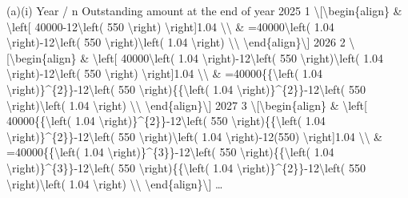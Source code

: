 \item (a)(i) Year / n Outstanding amount at the end of year 2025 1 \textbackslash{[}\textbackslash begin\{align\}
\& \textbackslash left{[} 40000-12\textbackslash left( 550 \textbackslash right)
\textbackslash right{]}1.04 \textbackslash\textbackslash{} \& =40000\textbackslash left(
1.04 \textbackslash right)-12\textbackslash left( 550 \textbackslash right)\textbackslash left(
1.04 \textbackslash right) \textbackslash\textbackslash{} \textbackslash end\{align\}\textbackslash{]}
2026 2 \textbackslash{[}\textbackslash begin\{align\} \& \textbackslash left{[}
40000\textbackslash left( 1.04 \textbackslash right)-12\textbackslash left(
550 \textbackslash right)\textbackslash left( 1.04 \textbackslash right)-12\textbackslash left(
550 \textbackslash right) \textbackslash right{]}1.04 \textbackslash\textbackslash{}
\& =40000\{\{\textbackslash left( 1.04 \textbackslash right)\}\textasciicircum\{2\}\}-12\textbackslash left(
550 \textbackslash right)\{\{\textbackslash left( 1.04 \textbackslash right)\}\textasciicircum\{2\}\}-12\textbackslash left(
550 \textbackslash right)\textbackslash left( 1.04 \textbackslash right)
\textbackslash\textbackslash{} \textbackslash end\{align\}\textbackslash{]}
2027 3 \textbackslash{[}\textbackslash begin\{align\} \& \textbackslash left{[}
40000\{\{\textbackslash left( 1.04 \textbackslash right)\}\textasciicircum\{2\}\}-12\textbackslash left(
550 \textbackslash right)\{\{\textbackslash left( 1.04 \textbackslash right)\}\textasciicircum\{2\}\}-12\textbackslash left(
550 \textbackslash right)\textbackslash left( 1.04 \textbackslash right)-12(550)
\textbackslash right{]}1.04 \textbackslash\textbackslash{} \& =40000\{\{\textbackslash left(
1.04 \textbackslash right)\}\textasciicircum\{3\}\}-12\textbackslash left(
550 \textbackslash right)\{\{\textbackslash left( 1.04 \textbackslash right)\}\textasciicircum\{3\}\}-12\textbackslash left(
550 \textbackslash right)\{\{\textbackslash left( 1.04 \textbackslash right)\}\textasciicircum\{2\}\}-12\textbackslash left(
550 \textbackslash right)\textbackslash left( 1.04 \textbackslash right)
\textbackslash\textbackslash{} \textbackslash end\{align\}\textbackslash{]}
\dots{}

